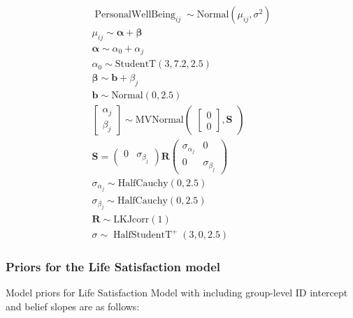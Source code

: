 \documentclass[
  english,
  man,floatsintext]{apa6}
\begin{document}
\[
\begin{aligned}
\operatorname{Personal Well Being}_{ij} \sim \text{Normal}(\mu_{ij},\sigma^2) \nonumber\\
\mu_{ij}\sim \boldsymbol{\alpha +\beta} \nonumber\\
\boldsymbol{\alpha} \sim \alpha_{0} +\alpha_j \nonumber\\
\alpha_{0} \sim \text{StudentT}(3,7.2,2.5)\nonumber\\
\boldsymbol{\beta}\sim \boldsymbol{b} + \beta_j \nonumber\\
\boldsymbol{b}\sim\text{Normal}(0,2.5) \nonumber\\
\begin{bmatrix}
\alpha_j \\
\beta_j
\end{bmatrix}
\sim 
\text{MVNormal}
\begin{pmatrix}
\begin{bmatrix}
0\\
0
\end{bmatrix}
,\boldsymbol{S} \nonumber
\end{pmatrix}\\
\boldsymbol{S} = 
\begin{pmatrix}
0 & \sigma_{\beta_j} \nonumber
\end{pmatrix} \boldsymbol{R} \begin{pmatrix}
\sigma_{\alpha_j} & 0 \\
0 & \sigma_{\beta_j} \nonumber
\end{pmatrix}\\
\sigma_{\alpha_j} \sim 
\text{HalfCauchy}(0,2.5) \nonumber\\
\sigma_{\beta_j} \sim 
\text{HalfCauchy}(0,2.5) \nonumber\\
\boldsymbol{R}\sim \text{LKJcorr}(1) \nonumber\\
\sigma  \sim  \operatorname{HalfStudent T}^{+}(3, 0, 2.5) 
\end{aligned}
\]

\newpage

\hypertarget{priors-for-the-life-satisfaction-model}{%
\subsubsection{Priors for the Life Satisfaction model}\label{priors-for-the-life-satisfaction-model}}

Model priors for Life Satisfaction Model with including group-level ID intercept and belief slopes are as follows:
\end{document}
